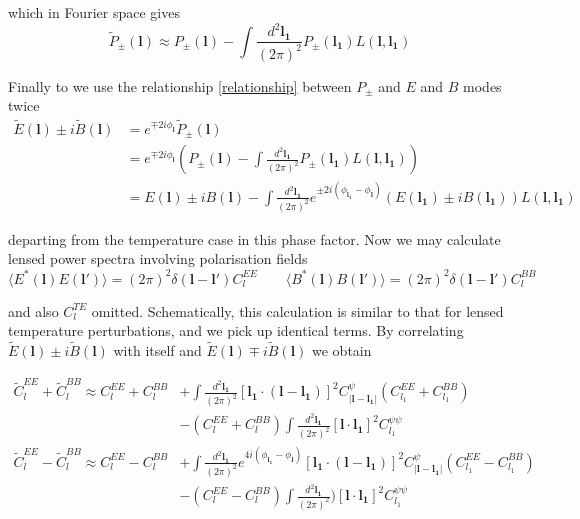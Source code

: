 \documentclass[a4paper,10pt]{article}
\renewcommand{\v}[1]{\mathbf{#1}}
\newcommand{\finttwo}[1]{\int \frac{d^2 \v{#1}}{(2\pi)^2}}
\begin{document}
which in Fourier space gives
\begin{equation}
\tilde{P}_{\pm}(\v{l}) \approx P_{\pm}(\v{l}) - \finttwo{l_1} P_{\pm}(\v{l_1})L(\v{l},\v{l_1})
\end{equation}

Finally to we use the relationship \ref{relationship} between $P_\pm$ and $E$ and $B$ modes twice
\begin{equation}\begin{split}
\tilde{E}(\v{l})\pm i\tilde{B}(\v{l}) &= e^{\mp 2i\phi_\v{l}}\tilde{P}_{\pm}(\v{l})\\
&=e^{\mp 2i\phi_\v{l}}\left(P_{\pm}(\v{l}) - \finttwo{l_1} P_{\pm}(\v{l_1})L(\v{l},\v{l_1})\right)\\
&=E(\v{l})\pm iB(\v{l})-\finttwo{l_1} e^{\pm 2i(\phi_\v{l_1}-\phi_\v{l})}(E(\v{l_1})\pm iB(\v{l_1}))L(\v{l},\v{l_1})
\label{lensedEBmodes}
\end{split}\end{equation}



departing from the temperature case in this phase factor. Now we may calculate lensed power spectra involving polarisation fields
\begin{equation}
\langle E^*(\v{l})E(\v{l}')\rangle = (2\pi)^2\delta(\v{l}-\v{l}')C_l^{EE} \qquad \langle B^*(\v{l})B(\v{l}')\rangle = (2\pi)^2\delta(\v{l}-\v{l}')C_l^{BB}
\end{equation}

and also $C_l^{TE}$ omitted. Schematically, this calculation is similar to that for lensed temperature perturbations, and we pick up identical terms. By correlating $\tilde{E}(\v{l})\pm i\tilde{B}(\v{l})$ with itself and $\tilde{E}(\v{l})\mp i\tilde{B}(\v{l})$ we obtain

\begin{equation}\begin{split}
\tilde{C}_l^{EE}+\tilde{C}_l^{BB} \approx C_l^{EE}+C_l^{BB}&+\finttwo{l_1}[ \v{l_1}\cdot(\v{l}-\v{l_1})]^2 C^\psi_{|\v{l}-\v{l_1}|}(C_{l_1}^{EE}+C_{l_1}^{BB}) \\
&- (C_{l}^{EE}+C_{l}^{BB})\finttwo{l_1} [\v{l}\cdot\v{l_1}]^2C_{l_1}^{\psi\psi}\\
\tilde{C}_l^{EE}-\tilde{C}_l^{BB} \approx C_l^{EE}-C_l^{BB}&+\finttwo{l_1}e^{4i(\phi_{\v{l_1}}-\phi_\v{l})}[ \v{l_1}\cdot(\v{l}-\v{l_1})]^2 C^\psi_{|\v{l}-\v{l_1}|}(C_{l_1}^{EE}-C_{l_1}^{BB})\\
&- (C_{l}^{EE}-C_{l}^{BB})\finttwo{l_1} )[\v{l}\cdot\v{l_1}]^2C_{l_1}^{\psi\psi}
\end{split}\end{equation}
\end{document}
